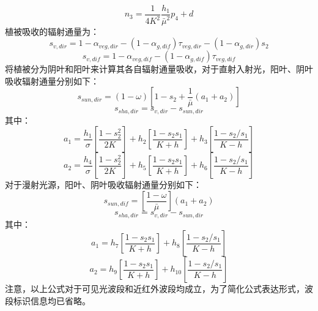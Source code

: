 \begin{equation}
n_{3}=\frac{1}{4 K^{2}} \frac{h_{1}}{\bar{\mu}^{2}} p_{4}+d
\end{equation}
植被吸收的辐射通量为：
\begin{equation}
s_{v, dir}=1-\alpha_{veg, dir}-\left(1-\alpha_{g, dif}\right) \tau_{veg, dir}-\left(1-\alpha_{g, dir}\right) s_{2}
\end{equation}
\begin{equation}
s_{v, dif}=1-\alpha_{veg, dif}-\left(1-\alpha_{g, dif}\right) \tau_{veg, dif}
\end{equation}
\citet{dai2004two} 将植被分为阴叶和阳叶来计算其各自辐射通量吸收，对于直射入射光，阳叶、阴叶吸收辐射通量分别如下：
\begin{equation}
s_{sun, dir}=(1-\omega)\left[1-s_{2}+\frac{1}{\bar{\mu}}\left(a_{1}+a_{2}\right)\right]
\end{equation}
\begin{equation}
s_{sha, dir}=s_{v, dir}-s_{sun, dir}
\end{equation}
其中：
\begin{equation}
a_{1}=\frac{h_{1}}{\sigma}\left[\frac{1-s_{2}^{2}}{2 K}\right]+h_{2}\left[\frac{1-s_{2} s_{1}}{K+h}\right]+h_{3}\left[\frac{1-s_{2} / s_{1}}{K-h}\right]
\end{equation}
%
\begin{equation}
a_{2}=\frac{h_{4}}{\sigma}\left[\frac{1-s_{2}^{2}}{2 K}\right]+h_{5}\left[\frac{1-s_{2} s_{1}}{K+h}\right]+h_{6}\left[\frac{1-s_{2} / s_{1}}{K-h}\right]
\end{equation}
对于漫射光源，阳叶、阴叶吸收辐射通量分别如下：
\begin{equation}
s_{sun,dif}=\left[\frac{1-\omega}{\bar{\mu}}\right]\left(a_{1}+a_{2}\right)
\end{equation}
\begin{equation}
s_{sha, dir}=s_{v, dir}-s_{sun, dir}
\end{equation}
其中：
\begin{equation}
a_{1}=h_{7}\left[\frac{1-s_{2} s_{1}}{K+h}\right]+h_{8}\left[\frac{1-s_{2} / s_{1}}{K-h}\right]
\end{equation}
%
\begin{equation}
a_{2}=h_{9}\left[\frac{1-s_{2} s_{1}}{K+h}\right]+h_{10}\left[\frac{1-s_{2} / s_{1}}{K-h}\right]
\end{equation}
注意，以上公式对于可见光波段和近红外波段均成立，为了简化公式表达形式，波段标识信息均已省略。



